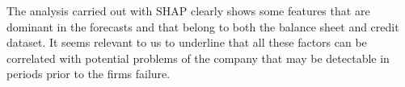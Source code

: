 The analysis carried out with SHAP clearly shows some features that are dominant in the forecasts and that belong to both the balance sheet and credit dataset. It seems relevant to us to underline that all these factors can be correlated with potential problems of the company that may be detectable in periods prior to the firms failure.







